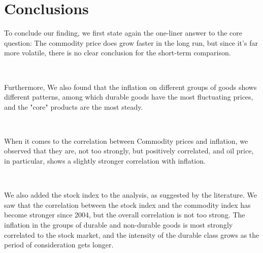 \documentclass{article}
\begin{document}
\section{Conclusions}

To conclude our finding, we first state again the one-liner answer to the core question: The commodity price does grow faster in the long run, but since it's far more volatile, there is no clear conclusion for the short-term comparison.

\

Furthermore, We also found that the inflation on different groups of goods shows different patterns, among which durable goods have the most fluctuating prices, and the "core" products are the most steady.

\

When it comes to the correlation between Commodity prices and inflation, we observed that they are, not too strongly, but positively correlated, and oil price, in particular, shows a slightly stronger correlation with inflation.

\

We also added the stock index to the analysis, as suggested by the literature. We saw that the correlation between the stock index and the  commodity index has become stronger since 2004, but the overall correlation is not too strong. The inflation in the groups of durable and non-durable goods is most strongly correlated to the stock market, and the intensity of the durable class grows as the period of consideration gets longer.

\newpage


\end{document}
